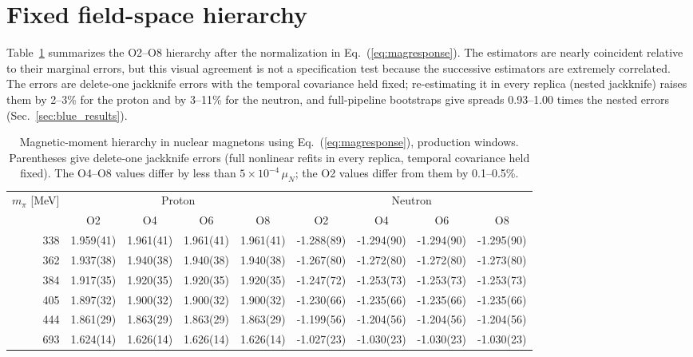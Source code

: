 \documentclass[aps,prd,reprint,twocolumn,superscriptaddress,nofootinbib,longbibliography]{revtex4-2}
\begin{document}
\section{Fixed field-space hierarchy}
\label{sec:fixedresults}

Table~\ref{tab:highhierarchy} summarizes the O2--O8 hierarchy after the normalization in Eq.~(\ref{eq:magresponse}). The estimators are nearly coincident relative to their marginal errors, but this visual agreement is not a specification test because the successive estimators are extremely correlated. The errors are delete-one jackknife errors with the temporal covariance held fixed; re-estimating it in every replica (nested jackknife) raises them by 2--3\% for the proton and by 3--11\% for the neutron, and full-pipeline bootstraps give spreads 0.93--1.00 times the nested errors (Sec.~\ref{sec:blue_results}).

\begin{table}[t]
\caption{Magnetic-moment hierarchy in nuclear magnetons using Eq.~(\ref{eq:magresponse}), production windows. Parentheses give delete-one jackknife errors (full nonlinear refits in every replica, temporal covariance held fixed). The O4--O8 values differ by less than $5\times10^{-4}\,\mu_N$; the O2 values differ from them by 0.1--0.5\%.}
\label{tab:highhierarchy}
\centering
\begin{tabular}{rcccc@{\hspace{1.5em}}cccc}
\toprule
$m_\pi$ [MeV]&\multicolumn{4}{c}{Proton}&\multicolumn{4}{c}{Neutron}\\
\cmidrule(lr){2-5}\cmidrule(lr){6-9}
& O2 & O4 & O6 & O8 & O2 & O4 & O6 & O8\\
\midrule
338&1.959(41)&1.961(41)&1.961(41)&1.961(41)&-1.288(89)&-1.294(90)&-1.294(90)&-1.295(90)\\
362&1.937(38)&1.940(38)&1.940(38)&1.940(38)&-1.267(80)&-1.272(80)&-1.272(80)&-1.273(80)\\
384&1.917(35)&1.920(35)&1.920(35)&1.920(35)&-1.247(72)&-1.253(73)&-1.253(73)&-1.253(73)\\
405&1.897(32)&1.900(32)&1.900(32)&1.900(32)&-1.230(66)&-1.235(66)&-1.235(66)&-1.235(66)\\
444&1.861(29)&1.863(29)&1.863(29)&1.863(29)&-1.199(56)&-1.204(56)&-1.204(56)&-1.204(56)\\
693&1.624(14)&1.626(14)&1.626(14)&1.626(14)&-1.027(23)&-1.030(23)&-1.030(23)&-1.030(23)\\
\bottomrule
\end{tabular}
\end{table}
\end{document}
